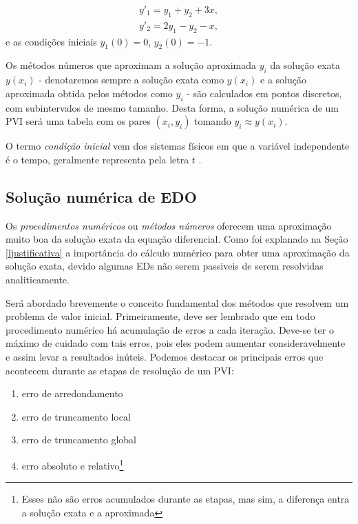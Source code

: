 \begin{equation*}
\begin{split}
y'_{1} = y_{1} + y_{2} + 3x, \\
y'_{2} = 2y_{1} - y_{2} -x,
\end{split}
\end{equation*}
e as condições iniciais $y_{1}(0) = 0$, $y_{2}(0) = -1$.

Os métodos números que aproximam a solução aproximada $y_{i}$ da solução exata $y(x_{i})$ - 
denotaremos sempre a solução exata como $y(x_{i})$ e a solução aproximada obtida pelos 
métodos como  $y_{i}$ - são calculados em pontos discretos, com subintervalos de mesmo tamanho.
Desta forma, a solução numérica de um PVI será uma tabela com os pares $(x_{i},y_{i})$
tomando $y_{i} \approx y(x_{i})$.

O termo \emph{condição inicial} vem dos sistemas físicos em que a variável independente
é o tempo, geralmente representa pela letra $t$ \cite{zill2003equacoes}.

\subsection{Solução numérica de EDO}
Os \emph{procedimentos numéricos} ou \emph{métodos números} oferecem uma aproximação muito
boa da solução exata da equação diferencial. Como foi explanado na Seção
\ref{ljustificativa} a importância do cálculo numérico para obter uma aproximação
da solução exata, devido algumas EDs não serem passiveis de serem resolvidas analiticamente.

Será abordado brevemente o conceito fundamental dos métodos que resolvem um 
problema de valor inicial. Primeiramente, deve ser lembrado que em todo 
procedimento numérico há acumulação de erros a cada iteração. Deve-se ter o máximo
de cuidado com tais erros, pois eles podem aumentar consideravelmente
e assim levar a resultados inúteis. Podemos destacar os principais erros  
que acontecem durante as etapas de resolução de um PVI:
\begin{enumerate}[label=\roman*.]
\item erro de arredondamento
\item erro de truncamento local
\item erro de truncamento global
\item erro absoluto e relativo\footnote{Esses não são erros acumulados durante
as etapas, mas sim, a diferença entra a solução exata e a aproximada}
\end{enumerate}

